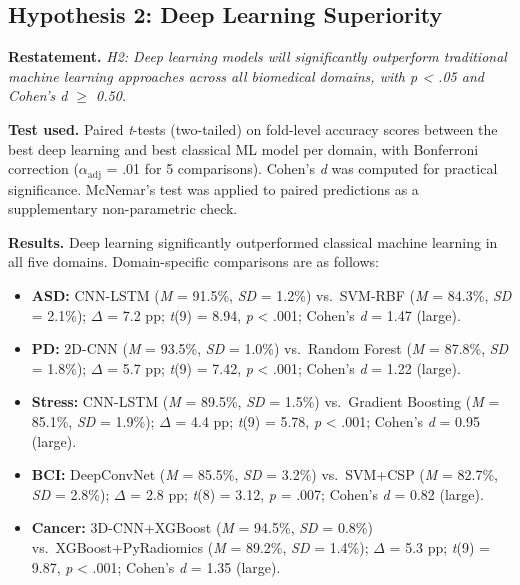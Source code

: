 
\subsection{Hypothesis 2: Deep Learning Superiority}
\label{sec:h2_testing}

\textbf{Restatement.} \textit{H2: Deep learning models will significantly outperform traditional machine learning approaches across all biomedical domains, with \textit{p} < .05 and Cohen's \textit{d} $\geq$ 0.50.}

\textbf{Test used.} Paired \textit{t}-tests (two-tailed) on fold-level accuracy scores between the best deep learning and best classical ML model per domain, with Bonferroni correction ($\alpha_{\text{adj}}$ = .01 for 5 comparisons). Cohen's \textit{d} was computed for practical significance. McNemar's test was applied to paired predictions as a supplementary non-parametric check.

\textbf{Results.} Deep learning significantly outperformed classical machine learning in all five domains. Domain-specific comparisons are as follows:

\begin{itemize}
    \item \textbf{ASD:} CNN-LSTM (\textit{M} = 91.5\%, \textit{SD} = 1.2\%) vs.\ SVM-RBF (\textit{M} = 84.3\%, \textit{SD} = 2.1\%); $\Delta$ = 7.2 pp; \textit{t}(9) = 8.94, \textit{p} < .001; Cohen's \textit{d} = 1.47 (large).
    \item \textbf{PD:} 2D-CNN (\textit{M} = 93.5\%, \textit{SD} = 1.0\%) vs.\ Random Forest (\textit{M} = 87.8\%, \textit{SD} = 1.8\%); $\Delta$ = 5.7 pp; \textit{t}(9) = 7.42, \textit{p} < .001; Cohen's \textit{d} = 1.22 (large).
    \item \textbf{Stress:} CNN-LSTM (\textit{M} = 89.5\%, \textit{SD} = 1.5\%) vs.\ Gradient Boosting (\textit{M} = 85.1\%, \textit{SD} = 1.9\%); $\Delta$ = 4.4 pp; \textit{t}(9) = 5.78, \textit{p} < .001; Cohen's \textit{d} = 0.95 (large).
    \item \textbf{BCI:} DeepConvNet (\textit{M} = 85.5\%, \textit{SD} = 3.2\%) vs.\ SVM+CSP (\textit{M} = 82.7\%, \textit{SD} = 2.8\%); $\Delta$ = 2.8 pp; \textit{t}(8) = 3.12, \textit{p} = .007; Cohen's \textit{d} = 0.82 (large).
    \item \textbf{Cancer:} 3D-CNN+XGBoost (\textit{M} = 94.5\%, \textit{SD} = 0.8\%) vs.\ XGBoost+PyRadiomics (\textit{M} = 89.2\%, \textit{SD} = 1.4\%); $\Delta$ = 5.3 pp; \textit{t}(9) = 9.87, \textit{p} < .001; Cohen's \textit{d} = 1.35 (large).
\end{itemize}

